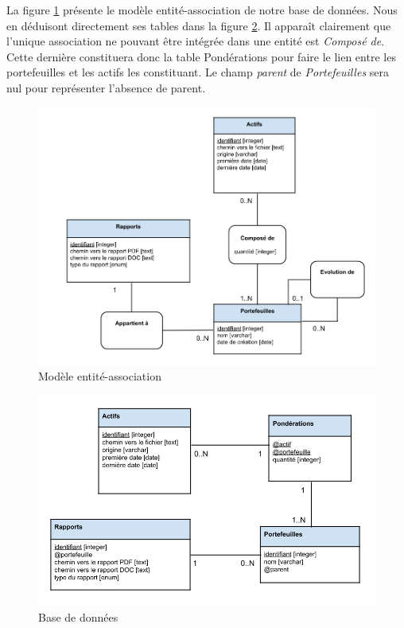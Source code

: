 \documentclass[a4paper]{report}
\begin{document}
La figure \ref{fig:modele-entite-association} présente le modèle entité-association de notre base de données.
Nous en déduisont directement ses tables dans la figure \ref{fig:base-donnees}.
Il apparaît clairement que l'unique association ne pouvant être intégrée dans une entité est \textit{Composé de}.
Cette dernière constituera donc la table Pondérations pour faire le lien entre les portefeuilles et les actifs les constituant.
Le champ \textit{parent} de \textit{Portefeuilles} sera nul pour représenter l'absence de parent.

\begin{figure}
  	\center
  	\includegraphics[width=1\textwidth]{modele-entite-association.png}
  	\caption{Modèle entité-association}
  	\label{fig:modele-entite-association}
\end{figure}

\begin{figure}
  	\center
  	\includegraphics[width=1\textwidth]{base-donnees.png}
  	\caption{Base de données}
  	\label{fig:base-donnees}
\end{figure}
\end{document}
